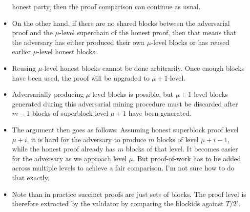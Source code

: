 \begin{itemize}
        honest party, then the proof comparison can continue as usual.
    \item
        On the other hand, if there are no shared blocks between the
        adversarial proof and the $\mu$-level superchain of the honest proof,
        then that means that the adversary has either produced their own
        $\mu$-level blocks or has reused earlier $\mu$-level honest blocks.
    \item
        Reusing $\mu$-level honest blocks cannot be done arbitrarily. Once
        enough blocks have been used, the proof will be upgraded to $\mu +
        1$-level.
    \item
        Adversarially producing $\mu$-level blocks is possible, but $\mu +
        1$-level blocks generated during this adversarial mining procedure must
        be discarded after $m - 1$ blocks of superblock level $\mu + 1$ have
        been generated.
    \item
        The argument then goes as follows: Assuming honest superblock proof
        level $\mu + i$, it is hard for the adversary to produce $m$ blocks of
        level $\mu + i - 1$, while the honest proof already has $m$ blocks of
        that level. It becomes easier for the adversary as we approach level
        $\mu$. But proof-of-work has to be added across multiple levels to
        achieve a fair comparison. I'm not sure how to do that exactly.
    \item
        Note than in practice succinct proofs are just sets of blocks. The
        proof level is therefore extracted by the validator by comparing
        the blockids against $T / 2^i$.
\end{itemize}
